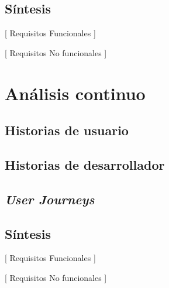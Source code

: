 \subsection{Síntesis}

[ Requisitos Funcionales ]

[ Requisitos No funcionales ]

\section{Análisis continuo}

\subsection{Historias de usuario}

\subsection{Historias de desarrollador}

\subsection{\textit{User Journeys}}

\subsection{Síntesis}

[ Requisitos Funcionales ]

[ Requisitos No funcionales ]
